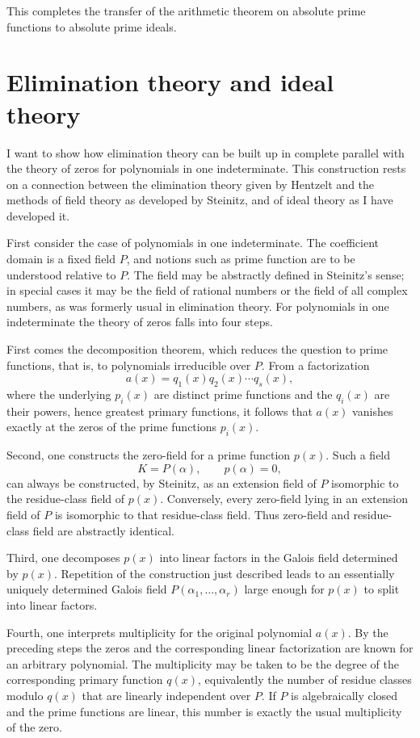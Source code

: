 \documentclass[12pt]{article}
\begin{document}
This completes the transfer of the arithmetic theorem on absolute prime functions to absolute prime ideals.

\newpage

\section{Elimination theory and ideal theory}

I want to show how elimination theory can be built up in complete parallel with the theory of zeros for polynomials in one indeterminate. This construction rests on a connection between the elimination theory given by Hentzelt and the methods of field theory as developed by Steinitz, and of ideal theory as I have developed it.

First consider the case of polynomials in one indeterminate. The coefficient domain is a fixed field $P$, and notions such as prime function are to be understood relative to $P$. The field may be abstractly defined in Steinitz's sense; in special cases it may be the field of rational numbers or the field of all complex numbers, as was formerly usual in elimination theory. For polynomials in one indeterminate the theory of zeros falls into four steps.

First comes the decomposition theorem, which reduces the question to prime functions, that is, to polynomials irreducible over $P$. From a factorization
\[
  a(x)=q_1(x)q_2(x)\cdots q_s(x),
\]
where the underlying $p_i(x)$ are distinct prime functions and the $q_i(x)$ are their powers, hence greatest primary functions, it follows that $a(x)$ vanishes exactly at the zeros of the prime functions $p_i(x)$.

Second, one constructs the zero-field for a prime function $p(x)$. Such a field
\[
  K=P(\alpha), \qquad p(\alpha)=0,
\]
can always be constructed, by Steinitz, as an extension field of $P$ isomorphic to the residue-class field of $p(x)$. Conversely, every zero-field lying in an extension field of $P$ is isomorphic to that residue-class field. Thus zero-field and residue-class field are abstractly identical.

Third, one decomposes $p(x)$ into linear factors in the Galois field determined by $p(x)$. Repetition of the construction just described leads to an essentially uniquely determined Galois field $P(\alpha_1,\ldots,\alpha_r)$ large enough for $p(x)$ to split into linear factors.

Fourth, one interprets multiplicity for the original polynomial $a(x)$. By the preceding steps the zeros and the corresponding linear factorization are known for an arbitrary polynomial. The multiplicity may be taken to be the degree of the corresponding primary function $q(x)$, equivalently the number of residue classes modulo $q(x)$ that are linearly independent over $P$. If $P$ is algebraically closed and the prime functions are linear, this number is exactly the usual multiplicity of the zero.
\end{document}
